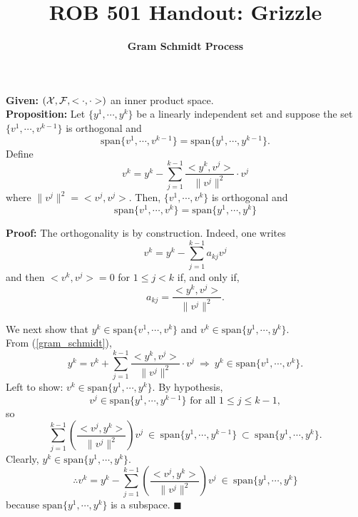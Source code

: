 \documentclass[11pt,twoside]{nsf_jwg}
\begin{document}

	\title{\Large \bf ROB 501 Handout: Grizzle}
	\author{{\bf Gram Schmidt Process}}
	\date{}
	\maketitle
	
	\Large


\noindent \textbf{Given:} $({\cal X, F}, <\cdot, \cdot>)$ an inner product space.\\


\noindent \textbf{Proposition:}
Let $\{ y^1, \cdots, y^k\}$ be a linearly independent set and suppose the set
$\{ v^1, \cdots, v^{k-1} \}$ is orthogonal and
 $$\mbox{span}\{ v^1, \cdots, v^{k-1} \} = \mbox{span}\{ y^1, \cdots, y^{k-1} \} .$$
 Define
 \begin{equation}
	v^k = y^k - \sum_{j=1}^{k-1}
	\frac{<y^k,v^j>}{\| v^j \|^2} \cdot v^j		\label{gram_schmidt}
\end{equation}
where $ \| v^j \|^2 = <v^j,v^j>$. Then, $\{ v^1, \cdots, v^{k} \}$ is orthogonal and
 $$\mbox{span}\{ v^1, \cdots, v^{k} \} = \mbox{span}\{ y^1, \cdots, y^{k} \} $$


 \noindent \textbf{Proof:} The orthogonality is by construction. Indeed, one writes
 $$v^k = y^k - \sum_{j=1}^{k-1} a_{kj}v^j	 $$
 and then $<v^k,v^j>=0$ for $1 \le j < k$  if, and only if,
 $$ a_{kj}=	\frac{<y^k,v^j>}{\| v^j \|^2} .$$


 We next show that $y^k \in \mbox{span}\{ v^1, \cdots, v^k \}$ and $v^k \in \mbox{span}\{ y^1, \cdots, y^k \}$.\\

From (\ref{gram_schmidt}),
\[
	y^k = v^k + \sum_{j=1}^{k-1}
	\frac{<y^k,v^j>}{\| v^j \|^2} \cdot v^j \ \Rightarrow \
	y^k \in
		\mbox{span}\{ v^1, \cdots, v^k \}.
\]
Left to show: $v^k \in \mbox{span}\{ y^1, \cdots, y^k \}$. By hypothesis,
\[
	v^j \in \mbox{span}\{ y^1, \cdots, y^{k-1} \}
		\mbox{ for all } 1 \leqslant j \leqslant k-1,
\]
so
\[
	\sum_{j=1}^{k-1}
	\left( \frac{<v^j,y^k>}{\| v^j \|^2} \right) v^j \
		\in \ \mbox{span}\{ y^1, \cdots, y^{k-1} \} \
		\subset \ \mbox{span}\{ y^1, \cdots, y^k \}.
\]
Clearly, $y^k \in \mbox{span}\{ y^1, \cdots, y^k \}$.
\[
	\therefore v^k = y^k - \sum_{j=1}^{k-1}
	\left( \frac{<v^j,y^k>}{\| v^j \|^2} \right) v^j \
		\in \ \mbox{span}\{ y^1, \cdots, y^k \}
\]
because $\mbox{span}\{ y^1, \cdots, y^k \}$ is a subspace. \hfill  $\blacksquare$
\end{document}
